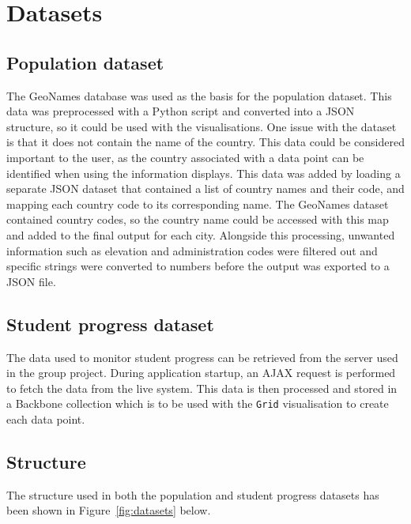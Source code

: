 \section{Datasets} {
\label{sec:datasets}

	\subsection{Population dataset} {
	\label{sec:population_dataset}

		The GeoNames database was used as the basis for the population dataset. This data was preprocessed with a Python script and converted into a JSON structure, so it could be used with the visualisations. One issue with the dataset is that it does not contain the name of the country. This data could be considered important to the user, as the country associated with a data point can be identified when using the information displays. This data was added by loading a separate JSON dataset that contained a list of country names and their code, and mapping each country code to its corresponding name. The GeoNames dataset contained country codes, so the country name could be accessed with this map and added to the final output for each city. Alongside this processing, unwanted information such as elevation and administration codes were filtered out and specific strings were converted to numbers before the output was exported to a JSON file.

	}

	\subsection{Student progress dataset} {
	\label{sec:student_progress_dataset}

		The data used to monitor student progress can be retrieved from the server used in the group project. During application startup, an AJAX request is performed to fetch the data from the live system. This data is then processed and stored in a Backbone collection which is to be used with the \texttt{Grid} visualisation to create each data point.

	}

	\subsection{Structure} {
	\label{sec:dataset_structure}

		The structure used in both the population and student progress datasets has been shown in Figure~\ref{fig:datasets} below.

		

	}

}

